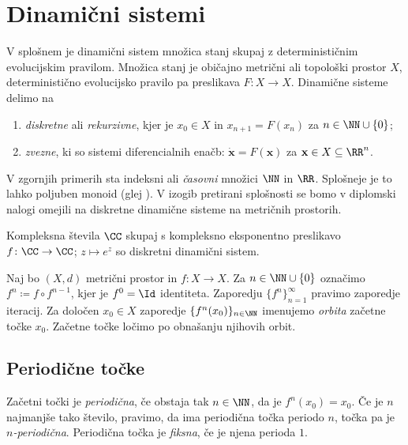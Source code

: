 \section{Dinamični sistemi} \label{sec:dis}

V splošnem je dinamični sistem množica stanj skupaj z determinističnim evolucijskim pravilom. Množica stanj je običajno metrični ali topološki prostor \(X\), deterministično evolucijsko pravilo pa preslikava \(F \colon X \to X\). Dinamične sisteme delimo na

\begin{enumerate}
    \item \emph{diskretne} ali \emph{rekurzivne}, kjer je \(x_0 \in X\) in \(x_{n + 1} = F (x_n)\) za \(n \in \NN \cup \{0\}\);
    \item \emph{zvezne}, ki so sistemi diferencialnih enačb: \(\dot{\mathbf{x}} = F (\mathbf{x})\) za \(\mathbf{x} \in X \subseteq \RR^n\).
\end{enumerate}

\noindent V zgornjih primerih sta indeksni ali \emph{časovni} množici \(\NN\) in \(\RR\). Splošneje je to lahko poljuben monoid (glej \cite{Giunti_2012}). V izogib pretirani splošnosti se bomo v diplomski nalogi omejili na diskretne dinamične sisteme na metričnih prostorih.

\begin{zgled}
    Kompleksna števila \(\CC\) skupaj s kompleksno eksponentno preslikavo \(f \colon \CC \to \CC\); \(z \mapsto e^{z}\) so diskretni dinamični sistem.
\end{zgled}

\noindent Naj bo \((X, d)\) metrični prostor in \(f \colon X \to X\). Za \(n \in \NN \cup \{0\}\) označimo \(f^n \coloneq f \circ f^{n - 1}\), kjer je \(f^0 = \Id\) identiteta. Zaporedju \(\{f^n\}_{n=1}^{\infty}\) pravimo zaporedje iteracij. Za določen \(x_0 \in X\) zaporedje \(\{f^n (x_0)\}_{n \in \NN}\) imenujemo \emph{orbita} začetne točke \(x_0\). Začetne točke ločimo po obnašanju njihovih orbit.

\subsection{Periodične točke}

Začetni točki je \emph{periodična}, če obstaja tak \(n \in \NN\), da je \(f^n (x_0) = x_0\). Če je \(n\) najmanjše tako število, pravimo, da ima periodična točka periodo \(n\), točka pa je \emph{\(n\)-periodična}. Periodična točka je \emph{fiksna}, če je njena perioda \(\num{1}\).

